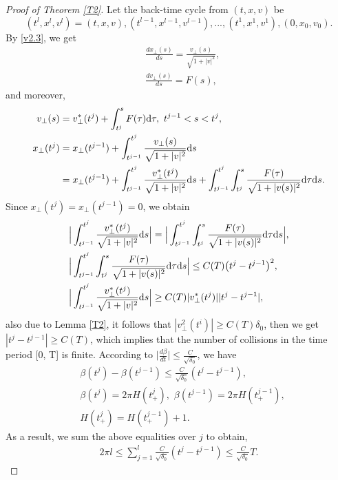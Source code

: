\documentclass[11pt,reqno]{amsart}%
\theoremstyle{definition}
\theoremstyle{remark}
\begin{document}
\begin{proof}[Proof of Theorem \ref{T2}]
Let the back-time cycle from $(t,x,v)$ be $$(t^{l},x^{l},v^{l})=(t,x,v),(t^{l-1},x^{l-1},v^{l-1}),...,(t^{1},x^{1},v^{1}), (0,x_{0},v_{0}).$$
By \eqref{v2.3}, we get
\begin{align}
&\frac{d x_{\bot}(s)}{d s}=\frac{v_{\bot}(s)}{\sqrt{1+|v|^{2}}},\nonumber\\
&\frac{d v_{\bot}(s)}{d s}= F(s),\nonumber
\end{align}
and moreover,
\begin{align}
v_{\bot}(s)&=v^{*}_{\bot}(t^{j})+\int^{s}_{t^{j}}F(\tau){\rm d}\tau, \,\, t^{j-1}< s<t^{j}, \nonumber\\
x_{\bot}(t^{j})&=x_{\bot}(t^{j-1})+\int^{t^{j}}_{t^{j-1}}\frac{v_{\bot}(s)}{\sqrt{1+|v|^{2}}}{\rm d}s\nonumber\\
&=x_{\bot}(t^{j-1})+\int^{t^{j}}_{t^{j-1}}\frac{v^{*}_{\bot}(t^{j})}{\sqrt{1+|v|^{2}}}{\rm d}s
+\int^{t^{j}}_{t^{j-1}}\int^{s}_{t^{j}}\frac{F(\tau)}{\sqrt{1+|v(s)|^{2}}}{\rm d}\tau{\rm d}s.\nonumber
\end{align}
Since $x_{\bot}(t^{j})=x_{\bot}(t^{j-1})=0$, we obtain
\begin{align}
&\Big|\int^{t^{j}}_{t^{j-1}}\frac{v^{*}_{\bot}(t^{j})}{\sqrt{1+|v|^{2}}}{\rm d}s\Big|
=\Big|\int^{t^{j}}_{t^{j-1}}\int^{s}_{t^{j}}\frac{F(\tau)}{\sqrt{1+|v(s)|^{2}}}{\rm d}\tau{\rm d}s\Big|,\nonumber\\
&\Big|\int^{t^{j}}_{t^{j-1}}\int^{s}_{t^{j}}\frac{F(\tau)}{\sqrt{1+|v(s)|^{2}}}{\rm d}\tau{\rm d}s\Big|\leq
C(T)\big(t^{j}-t^{j-1}\big)^{2},\nonumber\\
&\Big|\int^{t^{j}}_{t^{j-1}}\frac{v^{*}_{\bot}(t^{j})}{\sqrt{1+|v|^{2}}}{\rm d}s\Big|\geq C(T)|v^{*}_{\bot}(t^{j})||t^{j}-t^{j-1}|,\nonumber
\end{align}
also due to Lemma \ref{T2}, it follows that $|v^{2}_{\bot}(t^{i})|\geq C(T)\delta_{0}$,  then we get
$|t^{j}-t^{j-1}|\geq C(T)$, which implies that the number of collisions in the time period [0, T]  is finite.
According to $\Big|\frac{d \beta}{ d t}\Big|\leq \frac{C}{\sqrt{\delta_{0}}}$, we have
\begin{align}
&\beta(t^{j})-\beta(t^{j-1})\leq \frac{C}{\sqrt{\delta_{0}}}(t^{j}-t^{j-1}),\nonumber\\
&\beta(t^{j})=2\pi H(t^{j}_{+}),\,\,\beta(t^{j-1})=2\pi H(t^{j-1}_{+}),\nonumber\\
&H(t^{j}_{+})=H(t^{j-1}_{+})+1.\nonumber
\end{align}
As a result, we sum the above equalities over $j$ to obtain,
\begin{align}
2\pi l \leq \sum^{l}_{j=1}\frac{C}{\sqrt{\delta_{0}}}(t^{j}-t^{j-1})\leq \frac{C}{\sqrt{\delta_{0}}}T. \nonumber
\end{align}


\end{proof}
\end{document}

